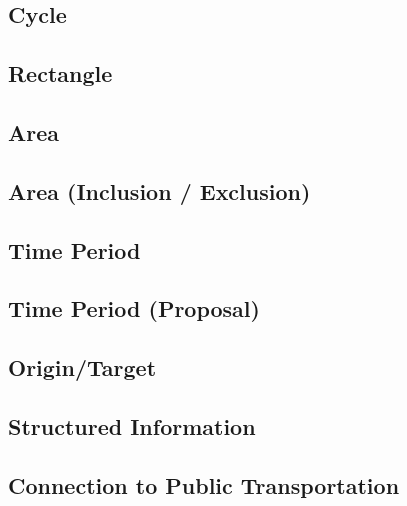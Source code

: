\subsection*{Cycle}



\subsection*{Rectangle}



\subsection*{Area}



\subsection*{Area (Inclusion / Exclusion)}



\subsection*{Time Period}



\subsection*{Time Period (Proposal)}



\subsection*{Origin/Target}



\subsection*{Structured Information}



\subsection*{Connection to Public Transportation}



